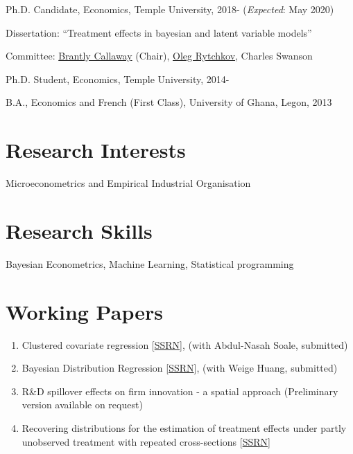 \documentclass[letterpaper]{article}
\renewenvironment{itemize}{
  \begin{list}{}{
    \setlength{\leftmargin}{1.5em}
  }
}{
  \end{list}
}
\begin{document}
\begin{itemize}
  \item Ph.D. Candidate, Economics, Temple University, 2018- (\textit{Expected}: May 2020)

  \begin{itemize}
    \item Dissertation: ``Treatment effects in bayesian and latent variable
    models''
    \item Committee:   \href{https://bcallaway11.github.io/index.html}
    {Brantly Callaway} (Chair), \href{https://astro.temple.edu/~rytchkov/}{Oleg Rytchkov}, Charles Swanson 
  \end{itemize}

	\item Ph.D. Student, Economics, Temple University, 2014-

  \item B.A., Economics and French (First Class), University of Ghana, Legon, 2013
\end{itemize}

\section*{Research Interests}
\begin{itemize}
  \item Microeconometrics and Empirical Industrial Organisation
\end{itemize}

\section*{Research Skills}
\begin{itemize}
	\item Bayesian Econometrics, Machine Learning, Statistical programming
\end{itemize}

\section*{Working Papers}
\begin{enumerate}
	\item Clustered covariate regression [\href{https://papers.ssrn.com/sol3/papers.cfm?abstract_id=3394012}{SSRN}], (with Abdul-Nasah Soale, submitted)
	\item Bayesian Distribution Regression [\href{https://papers.ssrn.com/sol3/papers.cfm?abstract_id=3048658}{SSRN}], (with Weige Huang, submitted)
	\item R\&D spillover effects on firm innovation - a spatial approach (Preliminary version available on request)
	\item Recovering distributions for the estimation of treatment
	effects under partly unobserved treatment with repeated
	cross-sections  [\href{https://papers.ssrn.com/sol3/papers.cfm?abstract_id=3194286}{SSRN}] 
\end{enumerate}
\end{document}
